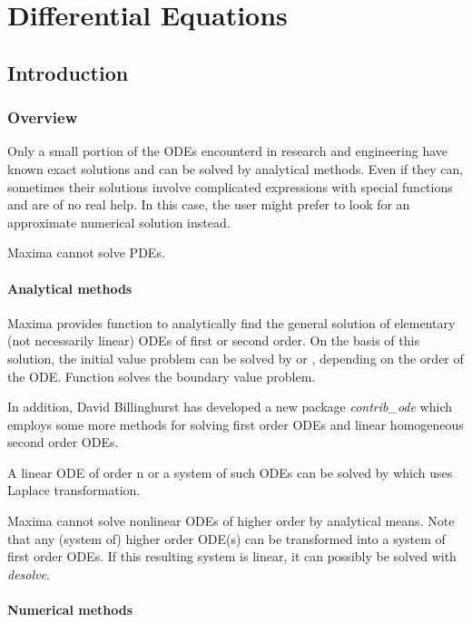 \documentclass[../Maxima_Workbook.tex]{subfiles}
\begin{document}
	
\chapter{Differential Equations}

\section{Introduction}

\subsection{Overview}

Only a small portion of the ODEs encounterd in research and engineering have known exact solutions and can be solved by analytical methods. Even if they can, sometimes their solutions involve complicated expressions with special functions and are of no real help. In this case, the user might prefer to look for an approximate numerical solution instead.

\lz Maxima cannot solve PDEs.

\subsubsection{Analytical methods}

\lz Maxima provides function  to analytically find the general solution of elementary (not necessarily linear) ODEs of first or second order. On the basis of this solution, the initial value problem can be solved by  or , depending on the order of the ODE. Function  solves the boundary value problem.

\lz In addition, David Billinghurst has developed a new package \emph{contrib\_ode} which employs some more methods for solving first order ODEs and linear homogeneous second order ODEs.

\lz A linear ODE of order n or a system of such ODEs can be solved by  which uses Laplace transformation.

\lz Maxima cannot solve nonlinear ODEs of higher order by analytical means. Note that any (system of) higher order ODE(s) can be transformed into a system of first order ODEs. If this resulting system is linear, it can possibly be solved with \emph{desolve}.

\subsubsection{Numerical methods}
\end{document}
